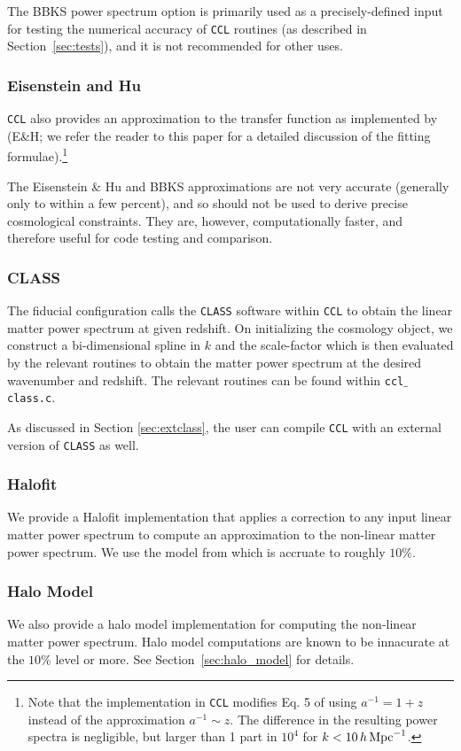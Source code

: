 \documentclass[\docopts]{\docclass}
\newcommand{\ccl}{{\tt CCL}\xspace}
\begin{document}
The BBKS power spectrum option is primarily used as a precisely-defined input for testing the numerical accuracy of \ccl routines (as described in Section~\ref{sec:tests}), and it is not recommended for other uses.

\subsubsection{Eisenstein and Hu}
\ccl also provides an approximation to the transfer function as implemented by
\citet{1998ApJ...496..605E} (E\&H; we refer the reader to this paper for a detailed
discussion of the fitting formulae).\footnote{Note that the implementation in \ccl modifies Eq. 5 of \citet{1998ApJ...496..605E} using $a^{-1}=1+z$ instead of the approximation $a^{-1}\sim z$. The difference in the resulting power spectra is negligible, but larger than 1 part in $10^4$ for $k<10\,h\,{\rm Mpc}^{-1}$.}

The Eisenstein \& Hu and BBKS approximations are not very accurate
(generally only to within a few percent), and so should not be used to derive
precise cosmological constraints. They are, however, computationally faster,
and therefore useful for code testing and comparison.

\subsubsection{CLASS}
The fiducial configuration calls the {\tt CLASS} software \citep{class} within \ccl to obtain the
linear matter power spectrum at given redshift. On initializing the cosmology object, we construct a
bi-dimensional spline in $k$ and the scale-factor which is then evaluated by the relevant routines
to obtain the matter power spectrum at the desired wavenumber and redshift. The relevant routines
can be found within {\tt ccl$\_$class.c}.

As discussed in Section \ref{sec:extclass}, the user can compile \ccl with an external version of {\tt CLASS} as well.

\subsubsection{Halofit}
We provide a Halofit implementation that applies a correction to any input linear matter power spectrum
to compute an approximation to the non-linear matter power spectrum. We use the model from \citet{CLASS_halofit}
which is accruate to roughly $10\%$.

\subsubsection{Halo Model}
We also provide a halo model implementation for computing the non-linear matter power spectrum. Halo model
computations are known to be innacurate at the $10\%$ level or more. See Section~\ref{sec:halo_model} for
details.
\end{document}
